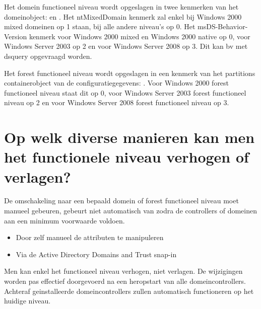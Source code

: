 Het domein functioneel niveau wordt opgeslagen in twee kenmerken van het
domeinobject:  en . Het
ntMixedDomain kenmerk zal enkel bij Windows 2000 mixed domeinen op 1 staan, bij
alle andere niveau's op 0. Het msDS-Behavior-Version kenmerk voor Windows 2000
mixed en Windows 2000 native op 0, voor Windows Server 2003 op 2 en voor Windows
Server 2008 op 3. Dit kan bv met dsquery opgevraagd worden.

Het forest functioneel niveau wordt opgeslagen in een kenmerk van het partitions
containerobject van de configuratiegegevens: .
Voor Windows 2000 forest functioneel niveau staat dit op 0, voor Windows Server
2003 forest functioneel niveau op 2 en voor Windows Server 2008 forest
functioneel niveau op 3.

\section{Op welk diverse manieren kan men het functionele niveau verhogen of
verlagen?}

De omschakeling naar een bepaald domein of forest functioneel niveau moet
manueel gebeuren, gebeurt niet automatisch van zodra de controllers of domeinen
aan een minimum voorwaarde voldoen.
\begin{itemize}
	\item Door zelf manueel de attributen te manipuleren
	\item Via de Active Directory Domains and Trust snap-in
\end{itemize}
Men kan enkel het functioneel niveau verhogen, niet verlagen. De wijzigingen
worden pas effectief doorgevoerd na een heropstart van alle domeincontrollers.
Achteraf geinstalleerde domeincontrollers zullen automatisch functioneren op het
huidige niveau.
